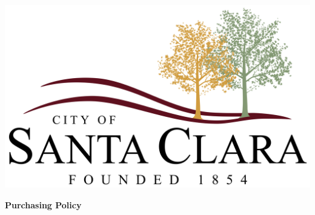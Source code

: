 \begin{titlepage}
	\centering %
	\includegraphics[width=\textwidth, height=0.8\textheight, keepaspectratio]{
		images/santa_clara_logo.png
	}
	\par
	\vspace{1cm}
	\vspace{1.5cm}
	{\huge\bfseries Purchasing Policy \par}

\end{titlepage}
